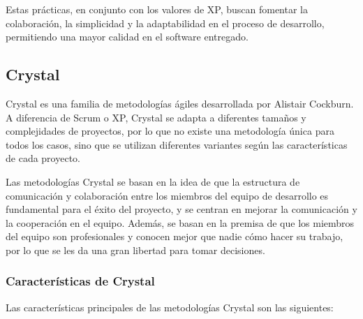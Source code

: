 \documentclass[executivepaper]{article}
\begin{document}
Estas prácticas, en conjunto con los valores de XP, buscan fomentar la colaboración, la simplicidad y la adaptabilidad en el proceso de desarrollo, permitiendo una mayor calidad en el software entregado.

\subsection{Crystal}

Crystal es una familia de metodologías ágiles desarrollada por Alistair Cockburn. A diferencia de Scrum o XP, Crystal se adapta a diferentes tamaños y complejidades de proyectos, por lo que no existe una metodología única para todos los casos, sino que se utilizan diferentes variantes según las características de cada proyecto.

Las metodologías Crystal se basan en la idea de que la estructura de comunicación y colaboración entre los miembros del equipo de desarrollo es fundamental para el éxito del proyecto, y se centran en mejorar la comunicación y la cooperación en el equipo. Además, se basan en la premisa de que los miembros del equipo son profesionales y conocen mejor que nadie cómo hacer su trabajo, por lo que se les da una gran libertad para tomar decisiones.

\subsubsection*{Características de Crystal}

Las características principales de las metodologías Crystal son las siguientes:
\end{document}
